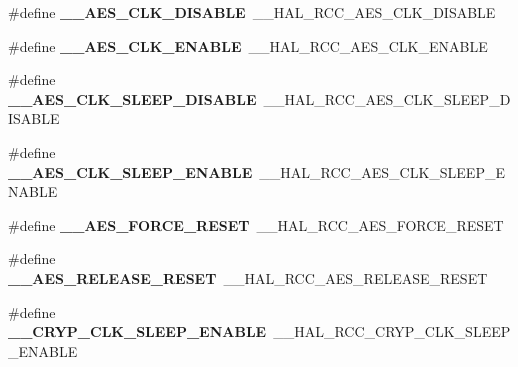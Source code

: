 \begin{DoxyCompactItemize}
\item 
\#define {\bfseries \+\_\+\+\_\+\+A\+E\+S\+\_\+\+C\+L\+K\+\_\+\+D\+I\+S\+A\+B\+LE}~\+\_\+\+\_\+\+H\+A\+L\+\_\+\+R\+C\+C\+\_\+\+A\+E\+S\+\_\+\+C\+L\+K\+\_\+\+D\+I\+S\+A\+B\+LE\hypertarget{group___h_a_l___r_c_c___aliased_gafed074f52db05d4c07cf496232bb3153}{}\label{group___h_a_l___r_c_c___aliased_gafed074f52db05d4c07cf496232bb3153}

\item 
\#define {\bfseries \+\_\+\+\_\+\+A\+E\+S\+\_\+\+C\+L\+K\+\_\+\+E\+N\+A\+B\+LE}~\+\_\+\+\_\+\+H\+A\+L\+\_\+\+R\+C\+C\+\_\+\+A\+E\+S\+\_\+\+C\+L\+K\+\_\+\+E\+N\+A\+B\+LE\hypertarget{group___h_a_l___r_c_c___aliased_ga0c5aad08bba28d384dc7e1181fee6b67}{}\label{group___h_a_l___r_c_c___aliased_ga0c5aad08bba28d384dc7e1181fee6b67}

\item 
\#define {\bfseries \+\_\+\+\_\+\+A\+E\+S\+\_\+\+C\+L\+K\+\_\+\+S\+L\+E\+E\+P\+\_\+\+D\+I\+S\+A\+B\+LE}~\+\_\+\+\_\+\+H\+A\+L\+\_\+\+R\+C\+C\+\_\+\+A\+E\+S\+\_\+\+C\+L\+K\+\_\+\+S\+L\+E\+E\+P\+\_\+\+D\+I\+S\+A\+B\+LE\hypertarget{group___h_a_l___r_c_c___aliased_ga709b3ad783f3e2b16fe5f07cf5cd9ad9}{}\label{group___h_a_l___r_c_c___aliased_ga709b3ad783f3e2b16fe5f07cf5cd9ad9}

\item 
\#define {\bfseries \+\_\+\+\_\+\+A\+E\+S\+\_\+\+C\+L\+K\+\_\+\+S\+L\+E\+E\+P\+\_\+\+E\+N\+A\+B\+LE}~\+\_\+\+\_\+\+H\+A\+L\+\_\+\+R\+C\+C\+\_\+\+A\+E\+S\+\_\+\+C\+L\+K\+\_\+\+S\+L\+E\+E\+P\+\_\+\+E\+N\+A\+B\+LE\hypertarget{group___h_a_l___r_c_c___aliased_gab14654c7c6b702e39853f88b35228b3d}{}\label{group___h_a_l___r_c_c___aliased_gab14654c7c6b702e39853f88b35228b3d}

\item 
\#define {\bfseries \+\_\+\+\_\+\+A\+E\+S\+\_\+\+F\+O\+R\+C\+E\+\_\+\+R\+E\+S\+ET}~\+\_\+\+\_\+\+H\+A\+L\+\_\+\+R\+C\+C\+\_\+\+A\+E\+S\+\_\+\+F\+O\+R\+C\+E\+\_\+\+R\+E\+S\+ET\hypertarget{group___h_a_l___r_c_c___aliased_ga1f40700201086bcf1ec079634db1a5e4}{}\label{group___h_a_l___r_c_c___aliased_ga1f40700201086bcf1ec079634db1a5e4}

\item 
\#define {\bfseries \+\_\+\+\_\+\+A\+E\+S\+\_\+\+R\+E\+L\+E\+A\+S\+E\+\_\+\+R\+E\+S\+ET}~\+\_\+\+\_\+\+H\+A\+L\+\_\+\+R\+C\+C\+\_\+\+A\+E\+S\+\_\+\+R\+E\+L\+E\+A\+S\+E\+\_\+\+R\+E\+S\+ET\hypertarget{group___h_a_l___r_c_c___aliased_ga223935e6b265768f91c37310d4f56205}{}\label{group___h_a_l___r_c_c___aliased_ga223935e6b265768f91c37310d4f56205}

\item 
\#define {\bfseries \+\_\+\+\_\+\+C\+R\+Y\+P\+\_\+\+C\+L\+K\+\_\+\+S\+L\+E\+E\+P\+\_\+\+E\+N\+A\+B\+LE}~\+\_\+\+\_\+\+H\+A\+L\+\_\+\+R\+C\+C\+\_\+\+C\+R\+Y\+P\+\_\+\+C\+L\+K\+\_\+\+S\+L\+E\+E\+P\+\_\+\+E\+N\+A\+B\+LE\hypertarget{group___h_a_l___r_c_c___aliased_ga639e05198e1aa4cf5e2f811cfd5478a9}{}\label{group___h_a_l___r_c_c___aliased_ga639e05198e1aa4cf5e2f811cfd5478a9}


\end{DoxyCompactItemize}
